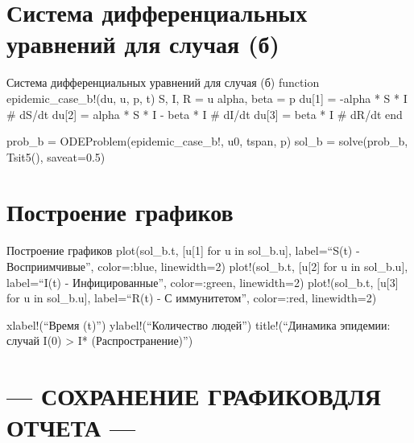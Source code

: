 \documentclass[
  ignorenonframetext,
  aspectratio=169,
  russian,
]{beamer}
\begin{document}
\section{Система дифференциальных уравнений для случая
(б)}\label{ux441ux438ux441ux442ux435ux43cux430-ux434ux438ux444ux444ux435ux440ux435ux43dux446ux438ux430ux43bux44cux43dux44bux445-ux443ux440ux430ux432ux43dux435ux43dux438ux439-ux434ux43bux44f-ux441ux43bux443ux447ux430ux44f-ux431}

\begin{frame}{Система дифференциальных уравнений для случая (б)}
function epidemic\_case\_b!(du, u, p, t) S, I, R = u alpha, beta = p
du{[}1{]} = -alpha * S * I \# dS/dt du{[}2{]} = alpha * S * I - beta * I
\# dI/dt du{[}3{]} = beta * I \# dR/dt end

prob\_b = ODEProblem(epidemic\_case\_b!, u0, tspan, p) sol\_b =
solve(prob\_b, Tsit5(), saveat=0.5)
\end{frame}

\section{Построение
графиков}\label{ux43fux43eux441ux442ux440ux43eux435ux43dux438ux435-ux433ux440ux430ux444ux438ux43aux43eux432-1}

\begin{frame}{Построение графиков}
plot(sol\_b.t, {[}u{[}1{]} for u in sol\_b.u{]}, label=\enquote{S(t) -
Восприимчивые}, color=:blue, linewidth=2) plot!(sol\_b.t, {[}u{[}2{]}
for u in sol\_b.u{]}, label=\enquote{I(t) - Инфицированные},
color=:green, linewidth=2) plot!(sol\_b.t, {[}u{[}3{]} for u in
sol\_b.u{]}, label=\enquote{R(t) - С иммунитетом}, color=:red,
linewidth=2)

xlabel!(\enquote{Время (t)}) ylabel!(\enquote{Количество людей})
title!(\enquote{Динамика эпидемии: случай I(0) \textgreater{} I*
(Распространение)})
\end{frame}

\section{--- СОХРАНЕНИЕ ГРАФИКОВДЛЯ ОТЧЕТА
---}\label{ux441ux43eux445ux440ux430ux43dux435ux43dux438ux435-ux433ux440ux430ux444ux438ux43aux43eux432ux434ux43bux44f-ux43eux442ux447ux435ux442ux430}
\end{document}
